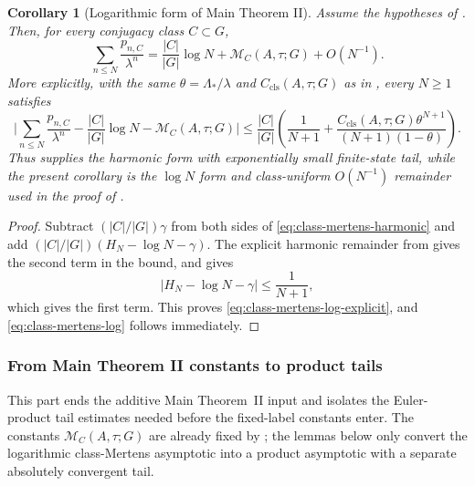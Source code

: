 \documentclass[11pt,a4paper]{amsart}
\theoremstyle{plain}
\newtheorem{corollary}[theorem]{Corollary}
\theoremstyle{definition}
\theoremstyle{remark}
\newcommand{\abs}[1]{\lvert #1 \rvert}
\begin{document}
\begin{corollary}[Logarithmic form of Main Theorem II]
  \label{cor:class-mertens-log-form}
  Assume the hypotheses of .  Then, for
  every conjugacy class \(C\subset G\),
  \begin{equation}\label{eq:class-mertens-log}
    \sum_{n\le N}\frac{p_{n,C}}{\lambda^n}
    =
    \frac{|C|}{|G|}\log N+\mathcal M_C(A,\tau;G)+O(N^{-1}).
  \end{equation}
  More explicitly, with the same \(\theta=\Lambda_*/\lambda\) and
  \(C_{\mathrm{cls}}(A,\tau;G)\) as in
  , every \(N\ge1\) satisfies
  \begin{equation}\label{eq:class-mertens-log-explicit}
    \abs{
      \sum_{n\le N}\frac{p_{n,C}}{\lambda^n}
      -\frac{|C|}{|G|}\log N
      -\mathcal M_C(A,\tau;G)
    }
    \le
    \frac{|C|}{|G|}
    \left(
      \frac{1}{N+1}
      +
      \frac{
        C_{\mathrm{cls}}(A,\tau;G)\theta^{N+1}
      }{
        (N+1)(1-\theta)
      }
    \right).
  \end{equation}
  Thus  supplies the harmonic form with
  exponentially small finite-state tail, while the present corollary is the
  \(\log N\) form and class-uniform \(O(N^{-1})\) remainder used in the
  proof of .
\end{corollary}

\begin{proof}
  Subtract \((|C|/|G|)\gamma\) from both sides of
  \eqref{eq:class-mertens-harmonic} and add
  \((|C|/|G|)(H_N-\log N-\gamma)\).  The explicit harmonic remainder from
   gives the second term in the bound, and
   gives
  \[
    \abs{H_N-\log N-\gamma}
    \le
    \frac{1}{N+1},
  \]
  which gives the first term.  This proves
  \eqref{eq:class-mertens-log-explicit}, and
  \eqref{eq:class-mertens-log} follows immediately.
\end{proof}

\subsubsection{From Main Theorem II constants to product tails}
\label{subsubsec:class-product-tail-reduction}

This part ends the additive Main Theorem~II input and isolates the Euler-product
tail estimates needed before the fixed-label constants enter.  The constants
\(\mathcal M_C(A,\tau;G)\) are already fixed by
; the lemmas below only convert the
logarithmic class-Mertens asymptotic into a product asymptotic with a separate
absolutely convergent tail.
\end{document}
